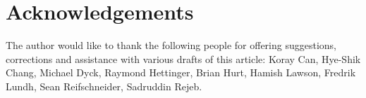 \documentclass{howto}
\begin{document}
\section{Acknowledgements \label{acks}}

The author would like to thank the following people for offering
suggestions, corrections and assistance with various drafts of this
article: Koray Can, Hye-Shik Chang, Michael Dyck, Raymond Hettinger,
Brian Hurt, Hamish Lawson, Fredrik Lundh, Sean Reifschneider,
Sadruddin Rejeb.
\end{document}
